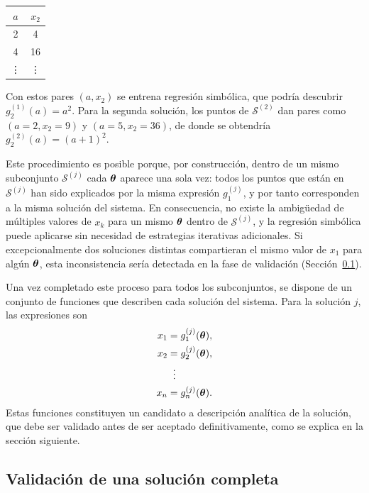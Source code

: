\begin{center} \begin{tabular}{c|c}
\(a\) & \(x_2\) \\
\hline
2 & 4 \\
4 & 16 \\
\vdots & \vdots \end{tabular} \end{center}

Con estos pares \((a, x_2)\) se entrena regresión simbólica, que podría descubrir \(g_2^{(1)}(a) = a^2\). Para la segunda solución, los puntos de \(\mathcal{S}^{(2)}\) dan pares como \((a = 2, x_2 = 9)\) y \((a = 5, x_2 = 36)\), de donde se obtendría \(g_2^{(2)}(a) = (a+1)^2\).

Este procedimiento es posible porque, por construcción, dentro de un mismo subconjunto \(\mathcal{S}^{(j)}\) cada \(\boldsymbol{\theta}\) aparece una sola vez: todos los puntos que están en \(\mathcal{S}^{(j)}\) han sido explicados por la misma expresión \(g_1^{(j)}\), y por tanto corresponden a la misma solución del sistema. En consecuencia, no existe la ambigüedad de múltiples valores de \(x_k\) para un mismo \(\boldsymbol{\theta}\) dentro de \(\mathcal{S}^{(j)}\), y la regresión simbólica puede aplicarse sin necesidad de estrategias iterativas adicionales. Si excepcionalmente dos soluciones distintas compartieran el mismo valor de \(x_1\) para algún \(\boldsymbol{\theta}\), esta inconsistencia sería detectada en la fase de validación (Sección~\ref{sec:validacion_solucion}).

Una vez completado este proceso para todos los subconjuntos, se dispone de un conjunto de funciones que describen cada solución del sistema. Para la solución \(j\), las expresiones son \[ \begin{aligned}
x_1 &= g_1^{(j)}(\boldsymbol{\theta}), \\
x_2 &= g_2^{(j)}(\boldsymbol{\theta}), \\
	&\;\;\vdots \\
x_n &= g_n^{(j)}(\boldsymbol{\theta}). \end{aligned} \] Estas funciones constituyen un candidato a descripción analítica de la solución, que debe ser validado antes de ser aceptado definitivamente, como se explica en la sección siguiente.

\subsection{Validación de una solución completa} \label{sec:validacion_solucion}

